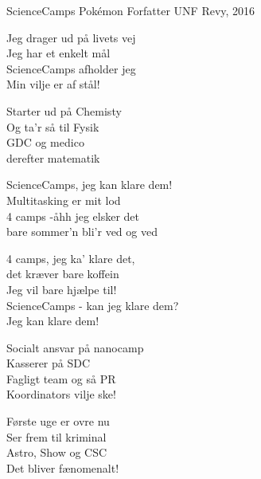 \begin{song}{ScienceCamps}
  {} %
  {Pokémon} %
  {Forfatter} %
  {UNF Revy, 2016} %
  {\NotCCLIed} %

  \begin{SBVerse}
    Jeg drager ud på livets vej\\
    Jeg har et enkelt mål\\
    ScienceCamps afholder jeg\\
    Min vilje er af stål!
  \end{SBVerse}

  \begin{SBVerse}
    Starter ud på Chemisty\\
    Og ta’r så til Fysik\\
    GDC og medico\\
    derefter matematik
  \end{SBVerse}

  \begin{SBChorus}
    ScienceCamps, jeg kan klare dem!\\
    Multitasking er mit lod\\
    4 camps -åhh jeg elsker det\\
    bare sommer’n bli’r ved og ved
  \end{SBChorus}

  \begin{SBSection*}
    4 camps, jeg ka’ klare det,\\
    det kræver bare koffein\\
    Jeg vil bare hjælpe til!\\
    ScienceCamps - kan jeg klare dem?\\
    Jeg kan klare dem!
  \end{SBSection*}

  \begin{SBVerse}
    Socialt ansvar på nanocamp\\
    Kasserer på SDC\\
    Fagligt team og så PR\\
    Koordinators vilje ske!
  \end{SBVerse}

  \begin{SBVerse}
    Første uge er ovre nu\\
    Ser frem til kriminal\\
    Astro, Show og CSC\\
    Det bliver fænomenalt!
  \end{SBVerse}


\end{song}
